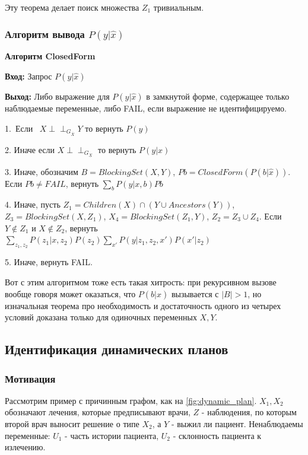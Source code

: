 \documentclass[fleqn]{article}
\newcommand{\independent}{\perp \!\!\! \perp}
\numberwithin{equation}{section}
\numberwithin{theorem}{section}
\numberwithin{figure}{section}
\numberwithin{lemma}{section}
\numberwithin{corollary}{section}
\begin{document}
Эту теорема делает поиск множества $Z_1$ тривиальным.

\subsubsection*{Алгоритм вывода $P(y|\hat x)$}

\textbf{Алгоритм ClosedForm}

\textbf{Вход:} Запрос $P(y|\hat x)$

\textbf{Выход:} Либо выражение для $P(y|\hat x)$ в замкнутой форме, содержащее только наблюдаемые переменные, либо FAIL, если выражение не идентифицируемо.

1. Если  $X \independent_{G_{\overline X}} Y$ то вернуть $P(y)$

2. Иначе если $X \independent_{G_{\underline{X}}}$ то вернуть $P(y|x)$

3. Иначе, обозначим $B = BlockingSet(X, Y)$, $Pb = ClosedForm(P(b|\hat x))$. Если $Pb \neq FAIL$, вернуть $\sum\limits_{b}P(y|x,b)Pb$

4. Иначе, пусть $Z_1 = Children(X) \cap (Y \cup Ancestors(Y))$, $Z_3 = BlockingSet(X, Z_1)$, $X_4 = BlockingSet(Z_1, Y)$, $Z_2 = Z_3 \cup Z_4$. Если $Y \notin Z_1$ и $X \notin Z_2$, вернуть $\sum\limits_{z_1, z_2}P(z_1|x,z_2)P(z_2)\sum\limits_{x'}P(y|z_1, z_2, x')P(x'|z_2)$

5. Иначе, вернуть FAIL.


Вот с этим алгоритмом тоже есть такая хитрость: при рекурсивном вызове вообще говоря может оказаться, что $P(b|\hat x)$ вызывается с $|B| > 1$, но изначальная теорема про необходимость и достаточность одного из четырех условий доказана только для одиночных переменных $X, Y$. 

\subsection*{Идентификация динамических планов}

\subsubsection*{Мотивация}

Рассмотрим пример с причинным графом, как на \ref{fig:dynamic_plan}. $X_1, X_2$ обозначают лечения, которые предписывают врачи, $Z$ - наблюдения, по которым второй врач выносит решение о типе $X_2$, а $Y$ - выжил ли пациент. Ненаблюдаемы переменные: $U_1$ - часть истории пациента, $U_2$ - склонность пациента к излечению. 
\end{document}
